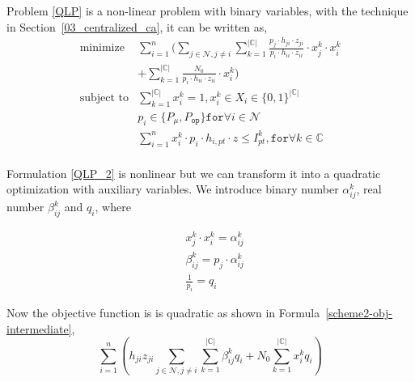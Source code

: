 \documentclass[times]{ettauth}
\theoremstyle{mytheoremstyle}
\theoremstyle{mytheoremstyle}
\theoremstyle{mytheoremstyle}
\begin{document}
Problem \ref{QLP} is a non-linear problem with binary variables, with the technique in Section~\ref{03_centralized_ca}, it can be written as,
	\begin{equation}
\label{QLP_2}
			\begin{aligned}
			\underset{}{\text{minimize}}
			& \sum\limits^{n}_{i=1} ( \sum\limits_{j\in\mathcal{N}, j\neq i}\sum\limits_{k=1}^{|\mathbb{C}|} \frac{p_j\cdot h_{ji}\cdot z_{ji}}{p_i\cdot h_{ii}\cdot z_{ii}}\cdot  x_j^k\cdot x_i^k  \\
			& + \sum\limits_{k=1}^{|\mathbb{C}|} \frac{N_0}{p_i\cdot h_{ii}\cdot z_{ii}}\cdot x_i^k)\\
			\text{subject to} 
			& \sum\limits_{k=1}^{|\mathbb{C}|}x_i^k=1, x_i^k\in X_i\in \{0,1\}^{|\mathbb{C}|}\\
			& p_i\in \{P_\mu, P_{\mathtt{op}}\} \mathtt{for} \forall i\in \mathcal{N}\\
			& \sum\limits^{n}_{i=1}x_i^k\cdot p_i\cdot h_{i,pt}\cdot z \leq I^k_{pt}, \mathtt{for}\forall k\in \mathbb{C} \\
			\end{aligned}
		\end{equation}
		
Formulation \ref{QLP_2} is nonlinear but we can transform it into a quadratic optimization with auxiliary variables.
We introduce binary number $\alpha_{ij}^k$, real number $\beta_{ij}^k$ and $q_i$, where

	
	\begin{align}
	& x_j^k\cdot x_i^k =\alpha_{ij}^k\label{alpha_opt}\\
	& \beta_{ij}^k = p_j\cdot \alpha_{ij}^k\label{beta_opt}\\
	& \frac{1}{p_i} = q_i\label{q_opt}	
	\end{align}
	
Now the objective function is is quadratic as shown in Formula~\ref{scheme2-obj-intermediate},
	\begin{equation}
	\label{scheme2-obj-intermediate}
	\sum\limits^{n}_{i=1} (h_{ji}z_{ji} \sum\limits_{j\in\mathcal{N}, j\neq i}  \sum\limits_{k=1}^{|\mathbb{C}|}  \beta_{ij}^k q_i  + N_0\sum\limits_{k=1}^{|\mathbb{C}|}  x_i^k q_i )
	\end{equation}
	
\end{document}
